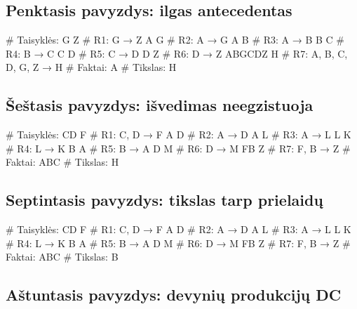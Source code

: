 \subsection{Penktasis pavyzdys: ilgas antecedentas}

\begin{pythonaienv}[bc]
# Taisyklės:
G Z                                     # R1: G → Z
A G                                     # R2: A → G
A B                                     # R3: A → B
B C                                     # R4: B → C
C D                                     # R5: C → D
D Z                                     # R6: D → Z
ABGCDZ H                                # R7: A, B, C, D, G, Z → H
# Faktai:
A
# Tikslas:
H
\end{pythonaienv}

\subsection{Šeštasis pavyzdys: išvedimas neegzistuoja}

\begin{pythonaienv}[bc]
# Taisyklės:
CD F                                    # R1: C, D → F
A D                                     # R2: A → D
A L                                     # R3: A → L
L K                                     # R4: L → K
B A                                     # R5: B → A
D M                                     # R6: D → M
FB Z                                    # R7: F, B → Z
# Faktai:
ABC
# Tikslas:
H
\end{pythonaienv}

\subsection{Septintasis pavyzdys: tikslas tarp prielaidų}

\begin{pythonaienv}[bc]
# Taisyklės:
CD F                                    # R1: C, D → F
A D                                     # R2: A → D
A L                                     # R3: A → L
L K                                     # R4: L → K
B A                                     # R5: B → A
D M                                     # R6: D → M
FB Z                                    # R7: F, B → Z
# Faktai:
ABC
# Tikslas:
B
\end{pythonaienv}

\subsection{Aštuntasis pavyzdys: devynių produkcijų DC}

